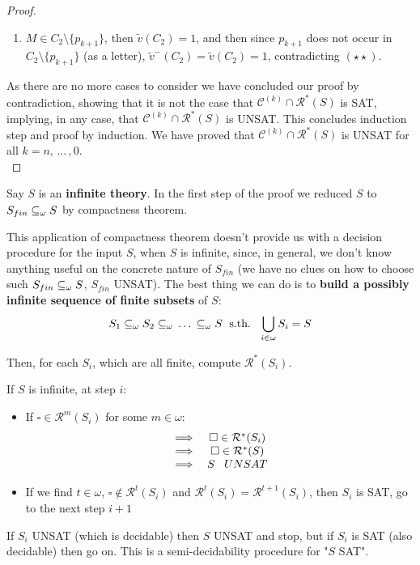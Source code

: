 \begin{proof}
\begin{enumerate}
	\item $M \in C_2 \setminus \{p_{k+1} \}$, then  $\tilde v (C_2) = 1$, and then since $p_{k+1}$ does not occur in $C_2 \setminus \{p_{k+1} \}$ (as a letter), $\tilde v^- (C_2) = \tilde v (C_2) = 1$, contradicting $(\star \star)$.
\end{enumerate}

As there are no more cases to consider we have concluded our proof by contradiction, showing that it is not the case that $\mathcal{C}^{(k)} \cap \mathcal{R}^\ast (S)$ is SAT, implying, in any case, that $\mathcal{C}^{(k)} \cap \mathcal{R}^\ast (S)$ is UNSAT. This concludes induction step and proof by induction. We have proved that $\mathcal{C}^{(k)} \cap \mathcal{R}^\ast (S)$ is UNSAT for all $k = n, \, \dots \, , 0$.\\
\end{proof}

\begin{remark}
	Say $S$ is an \textbf{infinite theory}. In the first step of the proof we reduced $S$ to $S_{fin} \subseteq_\omega S$ by compactness theorem.

	This application of compactness theorem doesn't provide us with a decision procedure for the input $S$, when $S$ is infinite, since, in general, we don't know anything useful on the concrete nature of $S_{fin}$ (we have no clues on how to choose such $S_{fin} \subseteq_\omega S$, $S_{fin}$ UNSAT). The best thing we can do is to \textbf{build a possibly infinite sequence of finite subsets} of $S$:
	$$
	S_1 \subseteq_\omega S_2 \subseteq_\omega \, \dots \, \subseteq_\omega S \; \text{ s.th. } \; \bigcup_{i \in \omega} S_i = S
	$$

\noindent
Then, for each $S_i$, which are all finite, compute $\mathcal{R}^\ast (S_i)$.\\
\end{remark}

\newpage

\begin{remark}
	If $S$ is infinite, at step $i$:
	\begin{itemize}
		\item If $\square \in \mathcal{R}^m (S_i)$ for some $m \in \omega$:
		$$
		\begin{array}{c c}
			\implies & \square \in \mathcal{R}^\ast (S_i) \\
			\implies & \square \in \mathcal{R}^\ast (S) \\
			\implies & S \;\;\; UNSAT
		\end{array}
		$$
		\item If we find $t \in \omega$, $\square \notin \mathcal{R}^t (S_i)$ and $\mathcal{R}^t (S_i) = \mathcal{R}^{t+1} (S_i)$, then $S_i$ is SAT, go to the next step $i+1$
	\end{itemize}

If $S_i$ UNSAT (which is decidable) then $S$ UNSAT and stop, but if $S_i$ is SAT (also decidable) then go on. This is a semi-decidability procedure for "$S$ SAT".
\end{remark}

